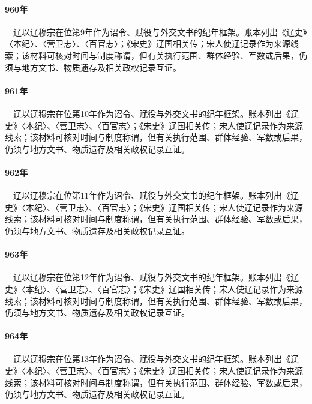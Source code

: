\paragraph{960年}　辽以辽穆宗在位第9年作为诏令、赋役与外交文书的纪年框架。账本列出《辽史》〈本纪〉、〈营卫志〉、〈百官志〉；《宋史》辽国相关传；宋人使辽记录作为来源线索；该材料可核对时间与制度称谓，但有关执行范围、群体经验、军数或后果，仍须与地方文书、物质遗存及相关政权记录互证。

\paragraph{961年}　辽以辽穆宗在位第10年作为诏令、赋役与外交文书的纪年框架。账本列出《辽史》〈本纪〉、〈营卫志〉、〈百官志〉；《宋史》辽国相关传；宋人使辽记录作为来源线索；该材料可核对时间与制度称谓，但有关执行范围、群体经验、军数或后果，仍须与地方文书、物质遗存及相关政权记录互证。

\paragraph{962年}　辽以辽穆宗在位第11年作为诏令、赋役与外交文书的纪年框架。账本列出《辽史》〈本纪〉、〈营卫志〉、〈百官志〉；《宋史》辽国相关传；宋人使辽记录作为来源线索；该材料可核对时间与制度称谓，但有关执行范围、群体经验、军数或后果，仍须与地方文书、物质遗存及相关政权记录互证。

\paragraph{963年}　辽以辽穆宗在位第12年作为诏令、赋役与外交文书的纪年框架。账本列出《辽史》〈本纪〉、〈营卫志〉、〈百官志〉；《宋史》辽国相关传；宋人使辽记录作为来源线索；该材料可核对时间与制度称谓，但有关执行范围、群体经验、军数或后果，仍须与地方文书、物质遗存及相关政权记录互证。

\paragraph{964年}　辽以辽穆宗在位第13年作为诏令、赋役与外交文书的纪年框架。账本列出《辽史》〈本纪〉、〈营卫志〉、〈百官志〉；《宋史》辽国相关传；宋人使辽记录作为来源线索；该材料可核对时间与制度称谓，但有关执行范围、群体经验、军数或后果，仍须与地方文书、物质遗存及相关政权记录互证。

